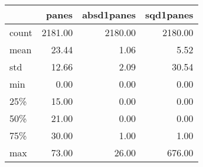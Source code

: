 \begin{tabular}{lrrr}
\toprule
{} &   panes &  absd1panes &  sqd1panes \\
\midrule
count & 2181.00 &     2180.00 &    2180.00 \\
mean  &   23.44 &        1.06 &       5.52 \\
std   &   12.66 &        2.09 &      30.54 \\
min   &    0.00 &        0.00 &       0.00 \\
25\%   &   15.00 &        0.00 &       0.00 \\
50\%   &   21.00 &        0.00 &       0.00 \\
75\%   &   30.00 &        1.00 &       1.00 \\
max   &   73.00 &       26.00 &     676.00 \\
\bottomrule
\end{tabular}
